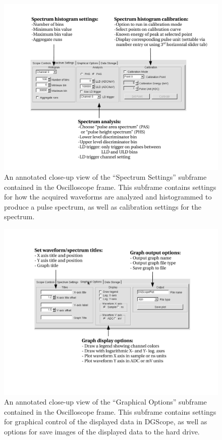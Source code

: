 \begin{figure}
  \centering
  \includegraphics[width=6in]{figures/OscilloscopeSpectrum}
    \caption{An annotated close-up view of the ``Spectrum Settings''
    subframe contained in the Oscilloscope frame. This subframe contains
    settings for how the acquired waveforms are analyzed and
    histogrammed to produce a pulse spectrum, as well as calibration
    settings for the spectrum.}
  \label{fig:spectrumsubframe}
\end{figure}


\begin{figure}
  \centering
  \includegraphics[width=6in]{figures/OscilloscopeGraphical}
  \caption{An annotated close-up view of the ``Graphical Options''
    subframe contained in the Oscilloscope frame. This subframe contains
    settings for graphical control of the displayed data in DGScope,
    as well as options for save images of the displayed data to the
    hard drive.}
  \label{fig:graphicalsubframe}
\end{figure}

